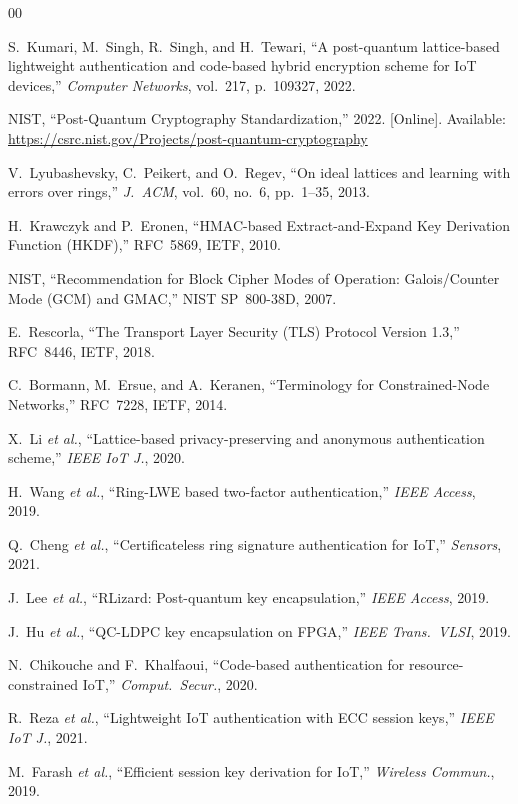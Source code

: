 \documentclass[conference]{IEEEtran}
\begin{document}
\begin{thebibliography}{00}

S.~Kumari, M.~Singh, R.~Singh, and H.~Tewari,
``A post-quantum lattice-based lightweight authentication and
code-based hybrid encryption scheme for IoT devices,''
\textit{Computer Networks}, vol.~217, p.~109327, 2022.

NIST, ``Post-Quantum Cryptography Standardization,'' 2022. [Online].
Available: \url{https://csrc.nist.gov/Projects/post-quantum-cryptography}

V.~Lyubashevsky, C.~Peikert, and O.~Regev,
``On ideal lattices and learning with errors over rings,''
\textit{J.\ ACM}, vol.~60, no.~6, pp.~1--35, 2013.

H.~Krawczyk and P.~Eronen,
``HMAC-based Extract-and-Expand Key Derivation Function (HKDF),''
RFC~5869, IETF, 2010.

NIST, ``Recommendation for Block Cipher Modes of Operation:
Galois/Counter Mode (GCM) and GMAC,'' NIST SP~800-38D, 2007.

E.~Rescorla,
``The Transport Layer Security (TLS) Protocol Version 1.3,''
RFC~8446, IETF, 2018.

C.~Bormann, M.~Ersue, and A.~Keranen,
``Terminology for Constrained-Node Networks,''
RFC~7228, IETF, 2014.

X.~Li \textit{et al.},
``Lattice-based privacy-preserving and anonymous authentication
scheme,'' \textit{IEEE IoT J.}, 2020.

H.~Wang \textit{et al.},
``Ring-LWE based two-factor authentication,''
\textit{IEEE Access}, 2019.

Q.~Cheng \textit{et al.},
``Certificateless ring signature authentication for IoT,''
\textit{Sensors}, 2021.

J.~Lee \textit{et al.},
``RLizard: Post-quantum key encapsulation,''
\textit{IEEE Access}, 2019.

J.~Hu \textit{et al.},
``QC-LDPC key encapsulation on FPGA,''
\textit{IEEE Trans.\ VLSI}, 2019.

N.~Chikouche and F.~Khalfaoui,
``Code-based authentication for resource-constrained IoT,''
\textit{Comput.\ Secur.}, 2020.

R.~Reza \textit{et al.},
``Lightweight IoT authentication with ECC session keys,''
\textit{IEEE IoT J.}, 2021.

M.~Farash \textit{et al.},
``Efficient session key derivation for IoT,''
\textit{Wireless Commun.}, 2019.

\end{thebibliography}
\end{document}
